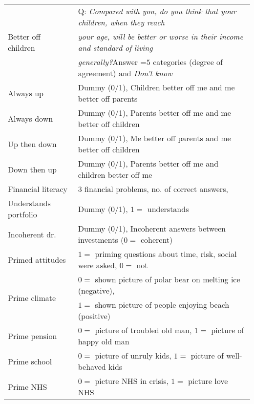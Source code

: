 \documentclass[a4paper,12pt]{article}
\begin{document}
{\begin{threeparttable}
\begin{small}
\begin{tabular}{ll}
\multirow{3}{*}{Better off children}&Q: \textit{Compared with you, do you think that your children, when they reach}\\
&\textit{your age, will be better or worse in their income and standard of living}\\
\vspace{0.14cm}& \textit{generally?}Answer =$5$ categories (degree of agreement) and \textit{Don't know}\\
\vspace{0.14cm}Always up&Dummy (0/1), Children better off me and me better off parents\\
\vspace{0.14cm}Always down&Dummy (0/1), Parents better off me and me better off children\\
\vspace{0.14cm}Up then down&Dummy (0/1), Me better off parents and me better off children\\
\vspace{0.14cm}Down then up&Dummy (0/1), Parents better off me and children better off me\\
\vspace{0.14cm}Financial literacy&$3$ financial problems, no. of correct answers, \citet{lusardi2014}\\
\vspace{0.14cm}Understands portfolio&Dummy (0/1), $1=$ understands\\
\vspace{0.14cm}Incoherent dr.&Dummy (0/1), Incoherent answers between investments ($0=$ coherent)\\
\vspace{0.14cm}Primed attitudes&$1=$ priming questions about time, risk, social were asked, $0=$ not\\
\multirow{2}{*}{Prime climate}&$0=$ shown picture of polar bear on melting ice (negative),\\
\vspace{0.14cm}& $1=$ shown picture of people enjoying beach (positive)\\
\vspace{0.14cm}Prime pension&$0=$ picture of troubled old man, $1=$ picture of happy old man\\
\vspace{0.14cm}Prime school&$0=$ picture of unruly kids, $1=$ picture of well-behaved kids\\
\vspace{0.14cm}Prime NHS&$0=$ picture NHS in crisis, $1=$ picture love NHS\\

\end{tabular}
\end{small}
\end{threeparttable}}
\end{document}
